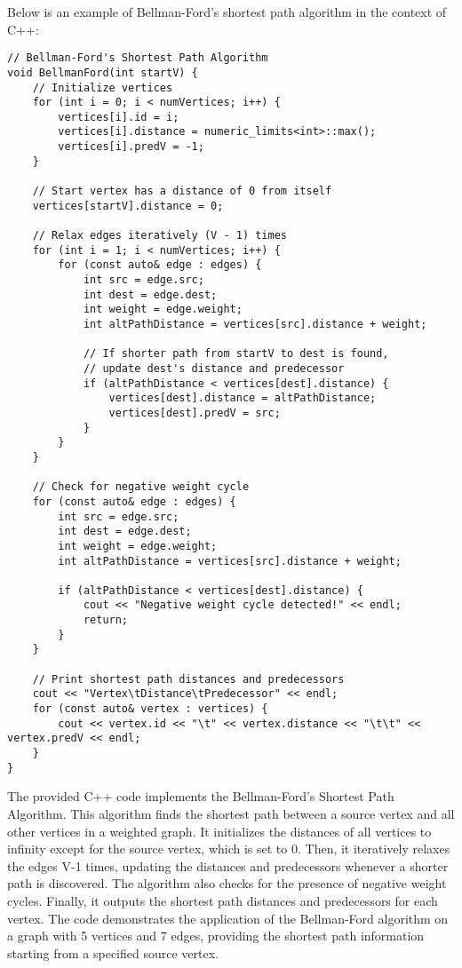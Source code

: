 \begin{solution}

Below is an example of Bellman-Ford's shortest path algorithm in the context of C++:

\horizontalline

\begin{verbatim}
// Bellman-Ford's Shortest Path Algorithm
void BellmanFord(int startV) {
    // Initialize vertices
    for (int i = 0; i < numVertices; i++) {
        vertices[i].id = i;
        vertices[i].distance = numeric_limits<int>::max();
        vertices[i].predV = -1;
    }

    // Start vertex has a distance of 0 from itself
    vertices[startV].distance = 0;

    // Relax edges iteratively (V - 1) times
    for (int i = 1; i < numVertices; i++) {
        for (const auto& edge : edges) {
            int src = edge.src;
            int dest = edge.dest;
            int weight = edge.weight;
            int altPathDistance = vertices[src].distance + weight;

            // If shorter path from startV to dest is found,
            // update dest's distance and predecessor
            if (altPathDistance < vertices[dest].distance) {
                vertices[dest].distance = altPathDistance;
                vertices[dest].predV = src;
            }
        }
    }

    // Check for negative weight cycle
    for (const auto& edge : edges) {
        int src = edge.src;
        int dest = edge.dest;
        int weight = edge.weight;
        int altPathDistance = vertices[src].distance + weight;

        if (altPathDistance < vertices[dest].distance) {
            cout << "Negative weight cycle detected!" << endl;
            return;
        }
    }

    // Print shortest path distances and predecessors
    cout << "Vertex\tDistance\tPredecessor" << endl;
    for (const auto& vertex : vertices) {
        cout << vertex.id << "\t" << vertex.distance << "\t\t" << vertex.predV << endl;
    }
}
\end{verbatim}

\horizontalline

The provided C++ code implements the Bellman-Ford's Shortest Path Algorithm. This algorithm finds the shortest path between a source vertex and all other vertices in a weighted graph. It initializes the distances of all vertices to 
infinity except for the source vertex, which is set to 0. Then, it iteratively relaxes the edges V-1 times, updating the distances and predecessors whenever a shorter path is discovered. The algorithm also checks for the presence of 
negative weight cycles. Finally, it outputs the shortest path distances and predecessors for each vertex. The code demonstrates the application of the Bellman-Ford algorithm on a graph with 5 vertices and 7 edges, providing the shortest 
path information starting from a specified source vertex.
    
\end{solution}

